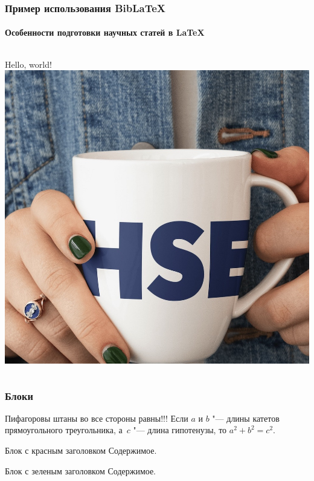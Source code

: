\documentclass[aspectratio=169]{beamer}
\begin{document}
\begin{frame}
\frametitle{Пример использования BibLaTeX}
\framesubtitle{Особенности подготовки научных статей в \LaTeX{}}
\medskip
\begin{columns}
Hello, world!
\includegraphics[width=\columnwidth]{image1}
\end{columns}
\end{frame}

\begin{frame}
\frametitle{Блоки}
	\begin{theorem}[Пифагора]
		Пифагоровы штаны во все стороны равны!!!
		Если $a$ и $b$ "--- длины катетов прямоугольного треугольника, а~$c$ "--- длина гипотенузы, то $a^2+b^2=c^2$.
	\end{theorem}

	\begin{alertblock}{Блок с красным заголовком}
		Содержимое.
	\end{alertblock}

	\begin{exampleblock}{Блок с зеленым заголовком}
		Содержимое.
	\end{exampleblock}
\end{frame}
\end{document}
